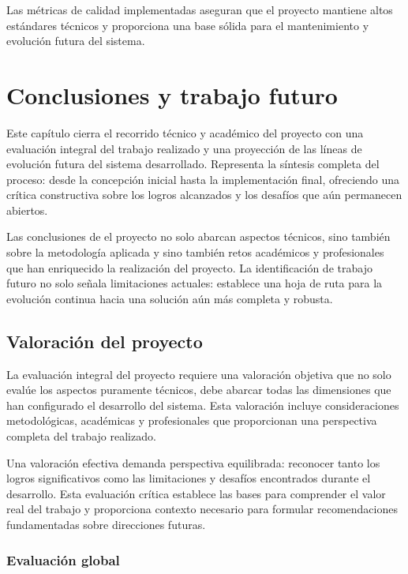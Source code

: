 \documentclass[12pt,a4paper,oneside]{report}
\begin{document}
Las métricas de calidad implementadas aseguran que el proyecto mantiene altos estándares técnicos y proporciona una base sólida para el mantenimiento y evolución futura del sistema.

\chapter{Conclusiones y trabajo
futuro}\label{conclusiones-y-trabajo-futuro}
Este capítulo cierra el recorrido técnico y académico del proyecto con una evaluación integral del trabajo realizado y una proyección de las líneas de evolución futura del sistema desarrollado. Representa la síntesis completa del proceso: desde la concepción inicial hasta la implementación final, ofreciendo una crítica constructiva sobre los logros alcanzados y los desafíos que aún permanecen abiertos.

Las conclusiones de el proyecto no solo abarcan aspectos técnicos, sino también sobre la metodología aplicada y sino también retos académicos y profesionales que han enriquecido la realización del proyecto. La identificación de trabajo futuro no solo señala limitaciones actuales: establece una hoja de ruta para la evolución continua hacia una solución aún más completa y robusta.

\section{Valoración del proyecto}\label{valoraciuxf3n-del-proyecto}

La evaluación integral del proyecto requiere una valoración objetiva que no solo evalúe los aspectos puramente técnicos, debe abarcar todas las dimensiones que han configurado el desarrollo del sistema. Esta valoración incluye consideraciones metodológicas, académicas y profesionales que proporcionan una perspectiva completa del trabajo realizado.

Una valoración efectiva demanda perspectiva equilibrada: reconocer tanto los logros significativos como las limitaciones y desafíos encontrados durante el desarrollo. Esta evaluación crítica establece las bases para comprender el valor real del trabajo y proporciona contexto necesario para formular recomendaciones fundamentadas sobre direcciones futuras.

\subsection{Evaluación global}\label{evaluaciuxf3n-global}
\end{document}
